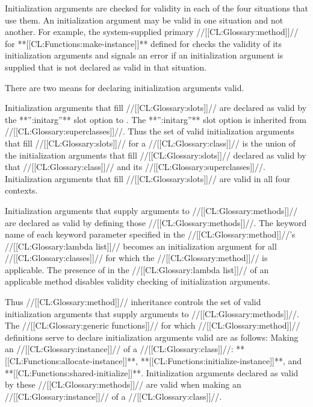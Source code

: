 \endsubsection%

 

Initialization arguments are checked for validity in each of the four situations that use them.  An initialization argument may be valid in one situation and not another. For example, the system-supplied      primary //[[CL:Glossary:method]]// for **[[CL:Functions:make-instance]]** defined for   checks the validity of its initialization arguments and signals an error if an initialization argument is supplied that is not declared as valid in that situation.

There are two means for declaring initialization arguments valid.

\beginlist

\itemitem{\bull} Initialization arguments that fill //[[CL:Glossary:slots]]// are declared as valid by the **'':initarg''** slot option to .  The **'':initarg''** slot option is inherited from //[[CL:Glossary:superclasses]]//.  Thus the set of valid initialization arguments that fill //[[CL:Glossary:slots]]// for a //[[CL:Glossary:class]]// is the union of the initialization arguments that fill //[[CL:Glossary:slots]]// declared as valid by that //[[CL:Glossary:class]]// and its //[[CL:Glossary:superclasses]]//.  Initialization arguments that fill //[[CL:Glossary:slots]]// are valid in all four contexts.

\itemitem{\bull} Initialization arguments that supply arguments to //[[CL:Glossary:methods]]// are declared as valid by defining those //[[CL:Glossary:methods]]//.  The keyword name of each keyword parameter specified in the //[[CL:Glossary:method]]//'s  //[[CL:Glossary:lambda list]]// becomes an initialization argument for all //[[CL:Glossary:classes]]//  for which the //[[CL:Glossary:method]]// is applicable.  The presence of {\allowotherkeys} in the //[[CL:Glossary:lambda list]]// of an applicable method disables validity checking of  initialization arguments.

Thus //[[CL:Glossary:method]]// inheritance controls the set of valid initialization arguments that supply arguments to //[[CL:Glossary:methods]]//.  The //[[CL:Glossary:generic functions]]// for which //[[CL:Glossary:method]]// definitions serve to declare initialization arguments valid are as follows: \beginlist                                               \itemitem{--} Making an //[[CL:Glossary:instance]]// of a //[[CL:Glossary:class]]//: **[[CL:Functions:allocate-instance]]**, **[[CL:Functions:initialize-instance]]**, and **[[CL:Functions:shared-initialize]]**.  Initialization arguments declared as valid by these //[[CL:Glossary:methods]]// are valid when making  an //[[CL:Glossary:instance]]// of a //[[CL:Glossary:class]]//.

